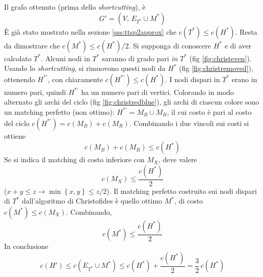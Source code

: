 Il grafo ottenuto (prima dello \emph{shortcutting}), è
\begin{equation*}
    G' = 
    (
        V, \,
        E_{T^*}
        \cup
        M^*
    )
\end{equation*}
È già stato mostrato nella sezione \ref{sss:ttsp2approx} che
$ c(T^*) \leq c(H^*) $.
Resta da dimostrare che
$
    c( M^*)
    \leq
    c\left( H^* \right) / 2
$.
Si supponga di conoscere $H^*$ e di aver calcolato $T^*$. Alcuni nodi in $T^*$ saranno di grado pari \emph{in} $T^*$
(fig \ref{fig:christeven}).
Usando lo \emph{shortcutting}, si rimuovono questi nodi da $
H^*
$
(fig \ref{fig:christremoved}), ottenendo $
H^{*'}
$, con chiaramente $
c( H^{*'})
\leq
c(H^* )
$.
I nodi dispari in $T^*$ erano in numero pari, quindi $
H^{*'}
$ ha un numero pari di vertici.
Colorando in modo alternato gli archi del ciclo
(fig \ref{fig:christredblue}),
gli archi di ciascun colore sono un matching perfetto (non ottimo): $
H^{*'}
= M_B \cup M_R
$, il cui costo è pari al costo del ciclo $
c( H^{*'}) = c(M_B) + c(M_R)
$. Combinando i due vincoli sui costi si ottiene
\begin{equation*}
    c(M_B) + c(M_R)
    \leq
    c(H^* )
\end{equation*}
Se si indica il matching di costo inferiore con $M_X$, deve valere
\begin{equation*}
    c(M_X)
    \leq
    \frac{
    c(H^* )
    }{2}
\end{equation*}
($x+y\leq z \to \min \left\{ x,y \right\} \leq z/2$).
Il matching perfetto 
costruito sui nodi dispari di $T^*$
dall'algoritmo di Christofides è quello ottimo $M^*$, di costo $
    c(M^*)
    \leq
    c(M_X)
$. Combinando,
\begin{equation*}
    c( M^*)
    \leq
    \frac{c\left( H^* \right)}{2}
\end{equation*}
In conclusione
\begin{equation*}
    c (H') \leq
    c ( E_{T^*} \cup M^*) \leq 
    c\left( H^* \right)
    +
    \frac{c\left( H^* \right)}{2}
    =
    \frac{3}{2} \,
    c\left( H^* \right)
\end{equation*}

